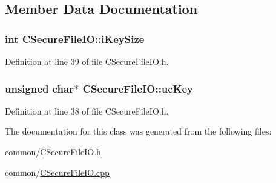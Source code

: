 \subsection{\-Member \-Data \-Documentation}
\hypertarget{class_c_secure_file_i_o_af55ac7c269cc10201170359307c20542}{
\subsubsection[{i\-Key\-Size}]{\setlength{\rightskip}{0pt plus 5cm}int {\bf \-C\-Secure\-File\-I\-O\-::i\-Key\-Size}}}\label{class_c_secure_file_i_o_af55ac7c269cc10201170359307c20542}


\-Definition at line 39 of file \-C\-Secure\-File\-I\-O.\-h.

\hypertarget{class_c_secure_file_i_o_a30dd558e0f000202e24b7633c3695156}{
\subsubsection[{uc\-Key}]{\setlength{\rightskip}{0pt plus 5cm}unsigned char$\ast$ {\bf \-C\-Secure\-File\-I\-O\-::uc\-Key}}}\label{class_c_secure_file_i_o_a30dd558e0f000202e24b7633c3695156}


\-Definition at line 38 of file \-C\-Secure\-File\-I\-O.\-h.



\-The documentation for this class was generated from the following files\-:\begin{DoxyCompactItemize}
\item 
common/\hyperlink{_c_secure_file_i_o_8h}{\-C\-Secure\-File\-I\-O.\-h}\item 
common/\hyperlink{_c_secure_file_i_o_8cpp}{\-C\-Secure\-File\-I\-O.\-cpp}\end{DoxyCompactItemize}
